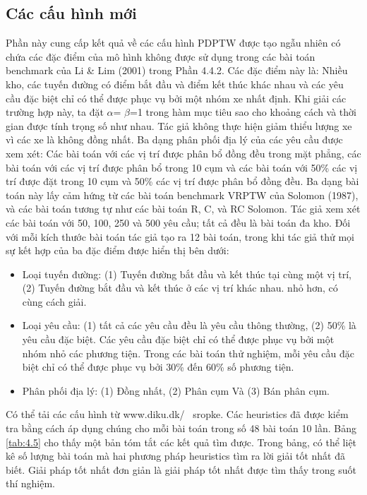 \subsection{Các cấu hình mới}

Phần này cung cấp kết quả về các cấu hình PDPTW được tạo ngẫu nhiên có chứa các đặc điểm của mô hình không được sử dụng trong các bài toán benchmark của Li \& Lim (2001) trong Phần 4.4.2. Các đặc điểm này là: Nhiều kho, các tuyến đường có điểm bắt đầu và điểm kết thúc khác nhau và các yêu cầu đặc biệt chỉ có thể được phục vụ bởi một nhóm xe nhất định. Khi giải các trường hợp này, ta đặt $\alpha$= $\beta$=1 trong hàm mục tiêu sao cho khoảng cách và thời gian được tính trọng số như nhau. Tác giả không thực hiện giảm thiểu lượng xe vì các xe là không đồng nhất. 
Ba dạng phân phối địa lý của các yêu cầu được xem xét: Các bài toán với các vị trí được phân bổ đồng đều trong mặt phẳng, các bài toán với các vị trí được phân bổ trong 10 cụm và các bài toán với 50\% các vị trí được đặt trong 10 cụm và 50\% các vị trí được phân bổ đồng đều. Ba dạng bài toán này lấy cảm hứng từ các bài toán benchmark VRPTW của Solomon (1987), và các bài toán tương tự như các bài toán R, C, và RC Solomon. Tác giả xem xét các bài toán với 50, 100, 250 và 500 yêu cầu; tất cả đều là bài toán đa kho. Đối với mỗi kích thước bài toán tác giả tạo ra 12 bài toán, trong khi tác giả thử mọi sự kết hợp của ba đặc điểm được hiển thị bên dưới:
\begin{itemize}
    \item Loại tuyến đường: (1) Tuyến đường bắt đầu và kết thúc tại cùng một vị trí, (2) Tuyến đường bắt đầu và kết thúc ở các vị trí khác nhau.
    nhỏ hơn, có cùng cách giải.
    \item Loại yêu cầu: (1) tất cả các yêu cầu đều là yêu cầu thông thường, (2) 50\% là yêu cầu đặc biệt. Các yêu cầu đặc biệt chỉ có thể được phục vụ bởi một nhóm nhỏ các phương tiện. Trong các bài toán thử nghiệm, mỗi yêu cầu đặc biệt chỉ có thể được phục vụ bởi 30\% đến 60\% số phương tiện.
    \item Phân phối địa lý: (1) Đồng nhất, (2) Phân cụm Và (3) Bán phân cụm.
\end{itemize}
Có thể tải các cấu hình từ www.diku.dk/ ~sropke. Các heuristics đã được kiểm tra bằng cách áp dụng chúng cho mỗi bài toán trong số 48 bài toán 10 lần. Bảng \ref{tab:4.5} cho thấy một bản tóm tắt các kết quả tìm được. Trong bảng, có thể liệt kê số lượng bài toán mà hai phương pháp heuristics tìm ra lời giải tốt nhất đã biết. Giải pháp tốt nhất đơn giản là giải pháp tốt nhất được tìm thấy trong suốt thí nghiệm.

